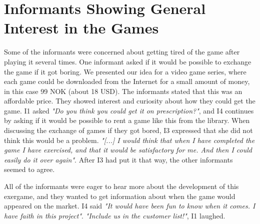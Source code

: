 \section{Informants Showing General Interest in the Games}

Some of the informants were concerned about getting tired of the game after playing it several times. One informant asked if it would be possible to exchange the game if it got boring. We presented our idea for a video game series, where each game could be downloaded from the Internet for a small amount of money, in this case 99 NOK (about 18 USD). The informants stated that this was an affordable price. They showed interest and curiosity about how they could get the game. I1 asked \emph{"Do you think you could get it on prescription?"}, and I4 continues by asking if it would be possible to rent a game like this from the library. When discussing the exchange of games if they got bored, I3 expressed that she did not think this would be a problem. \emph{"[...] I would think that when I have completed the game I have exercised, and that it would be satisfactory for me. And then I could easily do it over again"}. After I3 had put it that way, the other informants seemed to agree.

All of the informants were eager to hear more about the development of this exergame, and they wanted to get information about when the game would appeared on the market. I4 said \emph{"It would have been fun to know when it comes. I have faith in this project"}. \emph{"Include us in the customer list!"}, I1 laughed.



